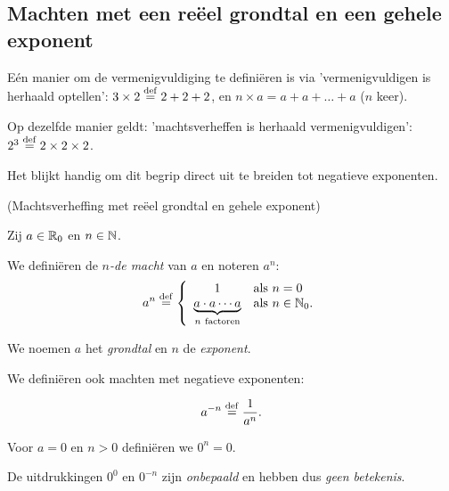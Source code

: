 \documentclass{ximera}
\begin{document}
    \author{Zomercursus KU Leuven}

\subsection{Machten met een re\"eel grondtal en een gehele exponent}

Eén manier om de vermenigvuldiging te definiëren is via 'vermenigvuldigen is herhaald optellen': $3\times 2 \overset{\mathrm{def}}{=} 2 + 2+ 2$, en $n\times a = a+a+\dots +a$ ($n$ keer). 

Op dezelfde manier geldt: 'machtsverheffen is herhaald vermenigvuldigen': $2^3 \overset{\mathrm{def}}{=} 2\times2\times2$. 

Het blijkt handig om dit begrip direct uit te breiden tot negatieve exponenten. 

\begin{definition}(Machtsverheffing met re\"eel grondtal en gehele exponent) \label{def:machten met gehele exponent}\ 
	
	Zij $a\in\mathbb{R}_0$ en $n\in\mathbb{N}$. 
	
	We definiëren de \emph{$n$-de macht}  van $a$ en noteren $a^n$:
	\[a^n\overset{\mathrm{def}}{=}
	\left\{
	\begin{array}{cl}
	1 & \textrm{als }n=0 \\
	\underbrace{a\cdot a\cdots a}_{n\mathrm{\ factoren}} & \textrm{als }n\in\mathbb{N}_0. \\
	\end{array}
	\right.\]
	
	We noemen $a$ het \textit{grondtal} en $n$ de \textit{exponent}.
		
	We definiëren ook machten met negatieve exponenten:
	
	\[a^{-n}\overset{\mathrm{def}}{=}\frac{1}{a^n}.\]
	
	Voor $a=0$ en $n>0$ definiëren we $0^n = 0$. 
	
	De uitdrukkingen $0^0$ en $0^{-n}$ zijn \textit{onbepaald} en hebben dus \textit{geen betekenis}.
	
\end{definition}

\end{document}
